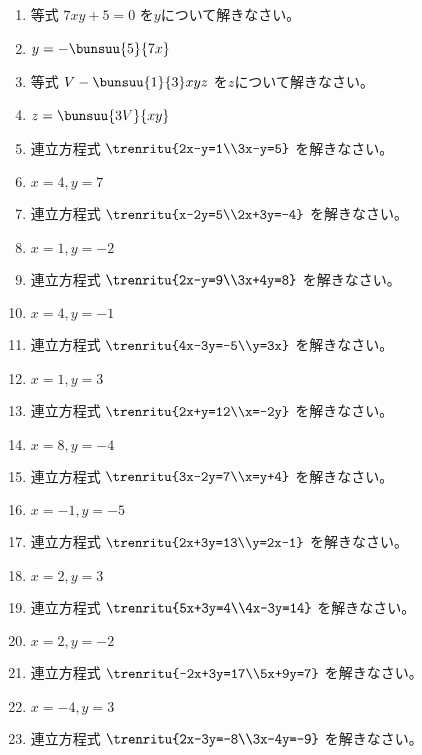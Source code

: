 \documentclass[uplatex,a4j,11pt]{jsreport}
\begin{document}
\begin{multicols}{2}
\begin{enumerate}
    \item 等式 $7xy+5 = 0$ を$y$について解きなさい。%
    \item $y=-\bunsuu{5}{7x}$
    \item 等式 $V-\bunsuu{1}{3}xyz$ を$z$について解きなさい。%
    \item $z=\bunsuu{3V}{xy}$
    \item 連立方程式 $\trenritu{2x-y=1\\3x-y=5}$ を解きなさい。%
    \item $x=4, y=7$
    \item 連立方程式 $\trenritu{x-2y=5\\2x+3y=-4}$ を解きなさい。%
    \item $x=1, y=-2$
    \item 連立方程式 $\trenritu{2x-y=9\\3x+4y=8}$ を解きなさい。%
    \item $x=4, y=-1$
    \item 連立方程式 $\trenritu{4x-3y=-5\\y=3x}$ を解きなさい。%
    \item $x=1, y=3$
    \item 連立方程式 $\trenritu{2x+y=12\\x=-2y}$ を解きなさい。%
    \item $x=8, y=-4$
    \item 連立方程式 $\trenritu{3x-2y=7\\x=y+4}$ を解きなさい。%
    \item $x=-1, y=-5$
    \item 連立方程式 $\trenritu{2x+3y=13\\y=2x-1}$ を解きなさい。%
    \item $x=2, y=3$
    \item 連立方程式 $\trenritu{5x+3y=4\\4x-3y=14}$ を解きなさい。%
    \item $x=2, y=-2$
    \item 連立方程式 $\trenritu{-2x+3y=17\\5x+9y=7}$ を解きなさい。%
    \item $x=-4, y=3$
    \item 連立方程式 $\trenritu{2x-3y=-8\\3x-4y=-9}$ を解きなさい。%

\end{enumerate}
\end{multicols}
\end{document}
